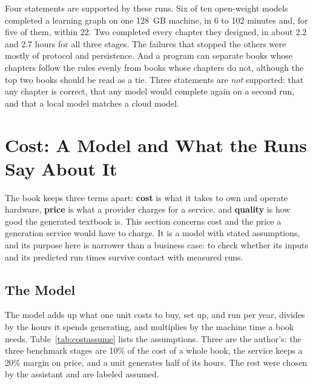 \documentclass[11pt]{article}
\begin{document}
Four statements are supported by these runs. Six of ten open-weight models completed a learning graph on one 128~GB machine, in 6 to 102 minutes and, for five of them, within 22. Two completed every chapter they designed, in about 2.2 and 2.7 hours for all three stages. The failures that stopped the others were mostly of protocol and persistence. And a program can separate books whose chapters follow the rules evenly from books whose chapters do not, although the top two books should be read as a tie. Three statements are \textit{not} supported: that any chapter is correct, that any model would complete again on a second run, and that a local model matches a cloud model.

\section{Cost: A Model and What the Runs Say About It}
\label{sec:cost}

The book keeps three terms apart: \textbf{cost} is what it takes to own and operate hardware, \textbf{price} is what a provider charges for a service, and \textbf{quality} is how good the generated textbook is. This section concerns cost and the price a generation service would have to charge. It is a model with stated assumptions, and its purpose here is narrower than a business case: to check whether its inputs and its predicted run times survive contact with measured runs.

\subsection{The Model}

The model adds up what one unit costs to buy, set up, and run per year, divides by the hours it spends generating, and multiplies by the machine time a book needs. Table~\ref{tab:costassume} lists the assumptions. Three are the author's: the three benchmark stages are 10\% of the cost of a whole book, the service keeps a 20\% margin on price, and a unit generates half of its hours. The rest were chosen by the assistant and are labeled assumed.
\end{document}
